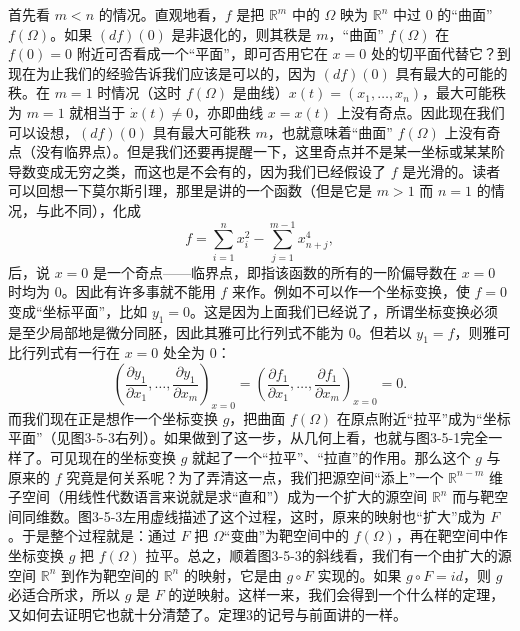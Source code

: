 首先看 $m<n$ 的情况。直观地看，$f$ 是把 $\mathbb R^m$ 中的 $\Omega$ 映为 $\mathbb R^n$ 中过 $0$ 的“曲面” $f(\Omega)$。如果 $(df)(0)$ 是非退化的，则其秩是 $m$，“曲面” $f(\Omega)$ 在 $f(0)=0$ 附近可否看成一个“平面”，即可否用它在 $x=0$ 处的切平面代替它？到现在为止我们的经验告诉我们应该是可以的，因为 $(df)(0)$ 具有最大的可能的秩。在 $m=1$ 时情况（这时 $f(\Omega)$ 是曲线）$x(t)=(x_1,\ldots,x_n)$，最大可能秩为 $m=1$ 就相当于 $\dot x(t)\ne0$，亦即曲线 $x=x(t)$ 上没有奇点。因此现在我们可以设想，$(df)(0)$ 具有最大可能秩 $m$，也就意味着“曲面” $f(\Omega)$ 上没有奇点（没有临界点）。但是我们还要再提醒一下，这里奇点并不是某一坐标或某某阶导数变成无穷之类，而这也是不会有的，因为我们已经假设了 $f$ 是光滑的。读者可以回想一下莫尔斯引理，那里是讲的一个函数（但是它是 $m>1$ 而 $n=1$ 的情况，与此不同），化成
\[
 f=\sum_{i=1}^{n}x_i^2-\sum_{j=1}^{m-1}x_{n+j}^4,
\]
后，说 $x=0$ 是一个奇点——临界点，即指该函数的所有的一阶偏导数在 $x=0$ 时均为 $0$。因此有许多事就不能用 $f$ 来作。例如不可以作一个坐标变换，使 $f=0$ 变成“坐标平面”，比如 $y_1=0$。这是因为上面我们已经说了，所谓坐标变换必须是至少局部地是微分同胚，因此其雅可比行列式不能为 $0$。但若以 $y_1=f$，则雅可比行列式有一行在 $x=0$ 处全为 $0$：
\[
 \left(\frac{\partial y_1}{\partial x_1},\ldots,
       \frac{\partial y_1}{\partial x_m}\right)_{x=0}
 =\left(\frac{\partial f_1}{\partial x_1},\ldots,
        \frac{\partial f_1}{\partial x_m}\right)_{x=0}=0.
\]
而我们现在正是想作一个坐标变换 $g$，把曲面 $f(\Omega)$ 在原点附近“拉平”成为“坐标平面”（见图3-5-3右列）。如果做到了这一步，从几何上看，也就与图3-5-1完全一样了。可见现在的坐标变换 $g$ 就起了一个“拉平”、“拉直”的作用。那么这个 $g$ 与原来的 $f$ 究竟是何关系呢？为了弄清这一点，我们把源空间“添上”一个 $\mathbb R^{n-m}$ 维子空间（用线性代数语言来说就是求“直和”）成为一个扩大的源空间 $\mathbb R^n$ 而与靶空间同维数。图3-5-3左用虚线描述了这个过程，这时，原来的映射也“扩大”成为 $F$。于是整个过程就是：通过 $F$ 把 $\Omega$“变曲”为靶空间中的 $f(\Omega)$，再在靶空间中作坐标变换 $g$ 把 $f(\Omega)$ 拉平。总之，顺着图3-5-3的斜线看，我们有一个由扩大的源空间 $\mathbb R^n$ 到作为靶空间的 $\mathbb R^n$ 的映射，它是由 $g\circ F$ 实现的。如果 $g\circ F=id$，则 $g$ 必适合所求，所以 $g$ 是 $F$ 的逆映射。这样一来，我们会得到一个什么样的定理，又如何去证明它也就十分清楚了。定理3的记号与前面讲的一样。

